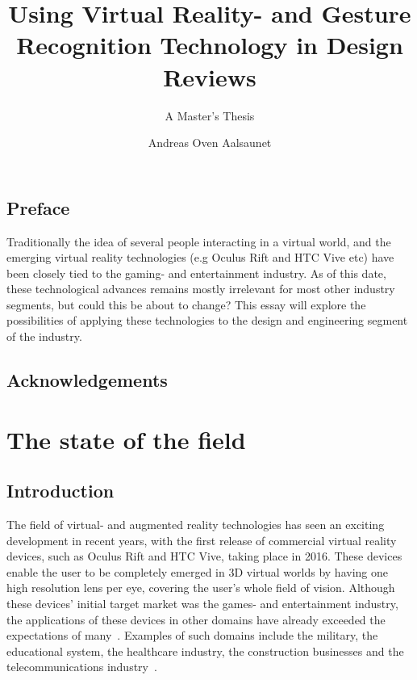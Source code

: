 \documentclass[UKenglish]{ifimaster}
\title{Using Virtual Reality- and Gesture Recognition Technology in Design Reviews}
\subtitle{A Master's Thesis}
\author{Andreas Oven Aalsaunet}
\begin{document}
\duoforside[dept={Department of Informatics},   
  program={Programming and Networks},  
  long]                                        

\frontmatter{}

\tableofcontents{}
\listoffigures{}
\listoftables{}

\chapter*{Preface}                    
Traditionally the idea of several people interacting in a virtual world, and the emerging virtual reality technologies (e.g Oculus Rift and HTC Vive etc) have been closely tied to the gaming- and entertainment industry. As of this date, these technological advances remains mostly irrelevant for most other industry segments, but could this be about to change? This essay will explore the possibilities of applying these technologies to the design and engineering segment of the industry.

\chapter*{Acknowledgements}  

\mainmatter{}
\part{The state of the field}                   

\chapter{Introduction}                  
The field of virtual- and augmented reality technologies has seen an exciting development in recent years, with the first release of commercial virtual reality devices, such as Oculus Rift and HTC Vive, taking place in 2016. These devices enable the user to be completely emerged in 3D virtual worlds by having one high resolution lens per eye, covering the user's whole field of vision. Although these devices' initial target market was the games- and entertainment industry, the applications of these devices in other domains have already exceeded the expectations of many~\citep{VRS2016}. Examples of such domains include the military, the educational system, the healthcare industry, the construction businesses and the telecommunications industry~\citep{VRS2016}. 
\end{document}
